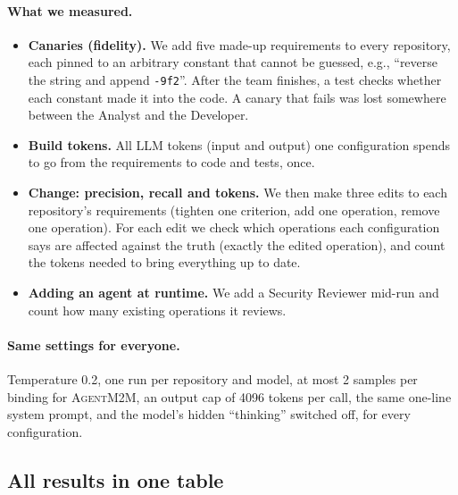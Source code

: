 \documentclass[10pt,a4paper]{article}
\newcommand{\tool}{\textsc{AgentM2M}}
\newcommand{\code}[1]{\texttt{#1}}
\theoremstyle{definition}
\begin{document}
\paragraph{What we measured.}
\begin{itemize}[nosep]
\item \textbf{Canaries (fidelity).} We add five made-up requirements to every
repository, each pinned to an arbitrary constant that cannot be guessed, e.g.,
``reverse the string and append \code{-9f2}''. After the team finishes, a test
checks whether each constant made it into the code. A canary that fails was
lost somewhere between the Analyst and the Developer.
\item \textbf{Build tokens.} All LLM tokens (input and output) one
configuration spends to go from the requirements to code and tests, once.
\item \textbf{Change: precision, recall and tokens.} We then make three edits
to each repository's requirements (tighten one criterion, add one operation,
remove one operation). For each edit we check which operations each
configuration says are affected against the truth (exactly the edited
operation), and count the tokens needed to bring everything up to date.
\item \textbf{Adding an agent at runtime.} We add a Security Reviewer mid-run
and count how many existing operations it reviews.
\end{itemize}

\paragraph{Same settings for everyone.} Temperature 0.2, one run per
repository and model, at most 2 samples per binding for \tool{}, an output cap
of 4096 tokens per call, the same one-line system prompt, and the model's
hidden ``thinking'' switched off, for every configuration.

\subsection{All results in one table}
\end{document}
